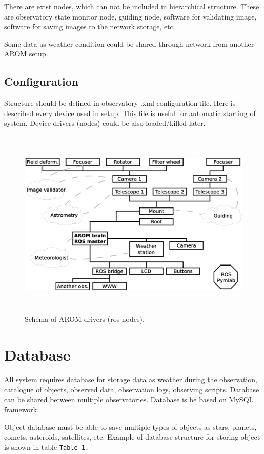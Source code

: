 \documentclass{ibws_template}
\begin{document}
There are exist nodes, which can not be included in hierarchical structure. These are observatory state monitor node, guiding node, software for validating image, software for saving images to the network storage, etc.

Some data as weather condition could be shared through network from another AROM setup.

\subsection{Configuration}
Structure should be defined in observatory .xml configuration file. Here is described every device used in setup. This file is useful for automatic starting of system. Device drivers (nodes) could be also loaded/killed later.


\begin{figure}[b!]
\begin{center}
\includegraphics[width=160mm, height=91mm]{img/ros_structuce.eps}
\caption{Schema of AROM drivers (ros nodes).} 
\end{center}
\end{figure}


\section{Database}
All system requires database for storage data as weather during the observation, catalogue of objects, observed data, observation logs, observing scripts. Database can be shared between multiple observatories. Database is be based on MySQL framework.

Object database must be able to save multiple types of objects as stars, planets, comets, asteroids, satellites, etc. Example of database structure for storing object is shown in table \texttt{Table 1.}
\end{document}
